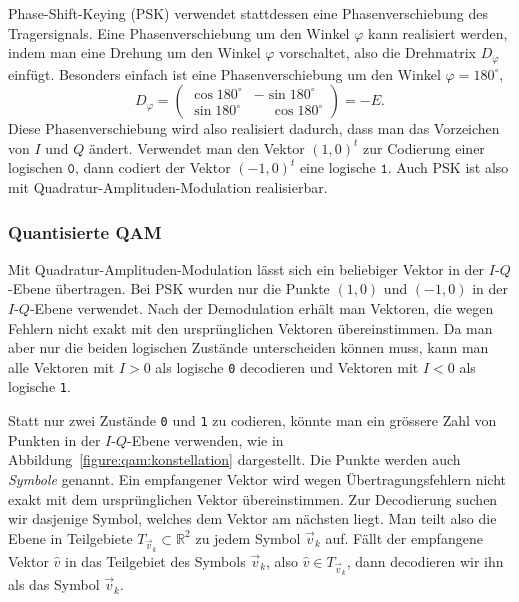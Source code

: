 Phase-Shift-Keying (PSK) verwendet stattdessen eine Phasenverschiebung
des Tragersignals.
Eine Phasenverschiebung um den Winkel $\varphi$ kann realisiert werden,
indem man eine Drehung um den Winkel $\varphi$ vorschaltet, also die
Drehmatrix $D_{\varphi}$ einfügt.
Besonders einfach ist eine Phasenverschiebung um den Winkel
$\varphi=180^\circ$, 
\[
D_{\varphi}
=
\begin{pmatrix}
\cos180^\circ&          - \sin180^\circ \\
\sin180^\circ& \phantom{-}\cos180^\circ
\end{pmatrix}
=
-E.
\]
Diese Phasenverschiebung wird also realisiert dadurch, dass man das
Vorzeichen von $I$ und $Q$ ändert.
Verwendet man den Vektor $(1,0)^t$ zur Codierung einer logischen
$\texttt{0}$, dann codiert der Vektor $(-1,0)^t$ eine logische $\texttt{1}$.
Auch PSK ist also mit Quadratur-Amplituden-Modulation realisierbar.

\subsubsection{Quantisierte QAM}
Mit Quadratur-Amplituden-Modulation lässt sich ein beliebiger Vektor
in der $I$-$Q$-Ebene übertragen.
Bei PSK wurden nur die Punkte $(1,0)$  und $(-1,0)$ in der $I$-$Q$-Ebene
verwendet.
Nach der Demodulation erhält man Vektoren, die wegen Fehlern nicht
exakt mit den ursprünglichen Vektoren übereinstimmen.
Da man aber nur die beiden logischen Zustände unterscheiden können muss,
kann man alle Vektoren mit $I>0$ als logische \texttt{0} decodieren
und Vektoren mit $I<0$ als logische \texttt{1}.

Statt nur zwei Zustände \texttt{0} und \texttt{1} zu codieren, könnte man
ein grössere Zahl von Punkten in der $I$-$Q$-Ebene verwenden, wie in
Abbildung~\ref{figure:qam:konstellation} dargestellt.
Die Punkte werden auch {\em Symbole} genannt.
Ein empfangener Vektor wird wegen Übertragungsfehlern nicht exakt mit
dem ursprünglichen Vektor übereinstimmen.
Zur Decodierung suchen wir dasjenige Symbol, welches dem Vektor am
nächsten liegt.
Man teilt also die Ebene in Teilgebiete $T_{\vec{v}_k}\subset \mathbb R^2$
zu jedem Symbol $\vec{v}_k$ auf.
Fällt der empfangene Vektor $\hat{v}$ in das Teilgebiet des Symbols
$\vec{v}_k$, also $\hat{v}\in T_{\vec{v}_k}$, dann decodieren wir ihn
als das Symbol $\vec{v}_k$.

